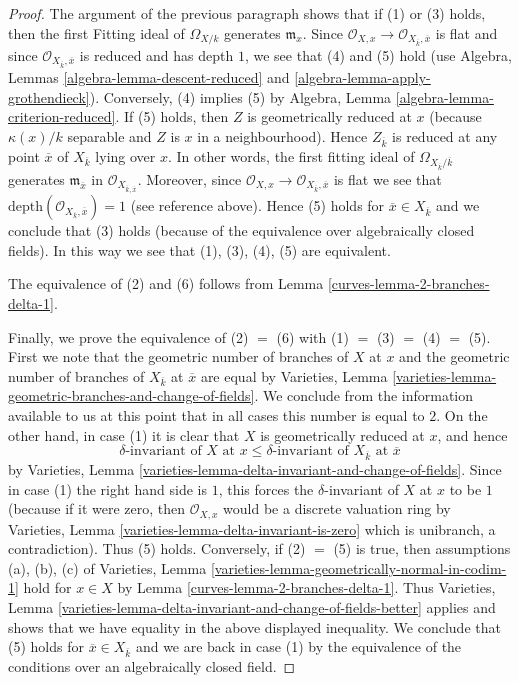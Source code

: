 \begin{proof}
\medskip\noindent
The argument of the previous paragraph shows that if (1) or (3) holds, then
the first Fitting ideal of $\Omega_{X/k}$ generates $\mathfrak m_x$.
Since $\mathcal{O}_{X, x} \to \mathcal{O}_{X_{\overline{k}}, \overline{x}}$
is flat and since $\mathcal{O}_{X_{\overline{k}}, \overline{x}}$
is reduced and has depth $1$, we see that (4) and (5) hold
(use Algebra, Lemmas \ref{algebra-lemma-descent-reduced} and
\ref{algebra-lemma-apply-grothendieck}).
Conversely, (4) implies (5) by
Algebra, Lemma \ref{algebra-lemma-criterion-reduced}.
If (5) holds, then $Z$ is geometrically reduced at $x$
(because $\kappa(x)/k$ separable and $Z$ is $x$ in a neighbourhood).
Hence $Z_{\overline{k}}$ is reduced at any point $\overline{x}$
of $X_{\overline{k}}$ lying over $x$. In other words, the first
fitting ideal of $\Omega_{X_{\overline{k}}/\overline{k}}$ generates
$\mathfrak m_{\overline{x}}$ in $\mathcal{O}_{X_{\overline{k}, \overline{x}}}$.
Moreover, since
$\mathcal{O}_{X, x} \to \mathcal{O}_{X_{\overline{k}}, \overline{x}}$ is flat
we see that $\text{depth}(\mathcal{O}_{X_{\overline{k}}, \overline{x}}) = 1$
(see reference above).
Hence (5) holds for $\overline{x} \in X_{\overline{k}}$ and we
conclude that (3) holds (because of the equivalence over algebraically
closed fields). In this way we see that (1), (3), (4), (5)
are equivalent.

\medskip\noindent
The equivalence of (2) and (6) follows from
Lemma \ref{curves-lemma-2-branches-delta-1}.

\medskip\noindent
Finally, we prove the equivalence of (2) $=$ (6) with
(1) $=$ (3) $=$ (4) $=$ (5). First we note that the geometric number
of branches of $X$ at $x$ and the geometric number of branches
of $X_{\overline{k}}$ at $\overline{x}$ are equal by
Varieties, Lemma
\ref{varieties-lemma-geometric-branches-and-change-of-fields}.
We conclude from the information available to us at this point
that in all cases this number is equal to $2$.
On the other hand, in case (1) it is clear that $X$ is geometrically
reduced at $x$, and hence
$$
\delta\text{-invariant of }X\text{ at }x \leq
\delta\text{-invariant of }X_{\overline{k}}\text{ at }\overline{x}
$$
by Varieties, Lemma \ref{varieties-lemma-delta-invariant-and-change-of-fields}.
Since in case (1) the right hand side is $1$, this
forces the $\delta$-invariant of $X$ at $x$ to be $1$
(because if it were zero, then $\mathcal{O}_{X, x}$ would
be a discrete valuation ring by
Varieties, Lemma \ref{varieties-lemma-delta-invariant-is-zero}
which is unibranch, a contradiction). Thus (5) holds.
Conversely, if (2) $=$ (5) is true, then assumptions (a), (b), (c) of
Varieties, Lemma \ref{varieties-lemma-geometrically-normal-in-codim-1}
hold for $x \in X$ by
Lemma \ref{curves-lemma-2-branches-delta-1}. Thus
Varieties, Lemma
\ref{varieties-lemma-delta-invariant-and-change-of-fields-better}
applies and shows that we have equality in the above displayed inequality.
We conclude that (5) holds for $\overline{x} \in X_{\overline{k}}$
and we are back in case (1) by the equivalence of the conditions
over an algebraically closed field.
\end{proof}

